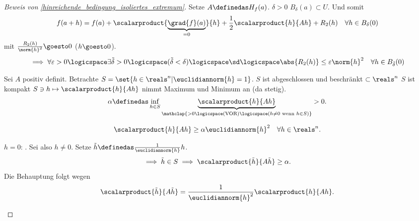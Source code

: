 \begin{proof}[Beweis von \ref{hinreichende_bedingung_isoliertes_extremum}]
  Setze \( A\definedas H_f(a) \). \texists \( \delta>0 \) \sd \( B_\delta(a)\subset U \). Und somit
  \begin{equation*}
    f(a+h)=f(a)+\scalarproduct{\underbrace{\grad{f}(a)}_{=0}}{h}+\frac{1}{2}\scalarproduct{h}{Ah}+R_2(h)\quad \forall h\in B_\delta(0)
  \end{equation*}
  mit \( \frac{R_2(h)}{\norm{h}^2}\goesto 0 \) (\( h\goesto 0 \)).
  \begin{equation*}
    \implies \forall \varepsilon>0 \logicspace \exists \tilde{\delta}>0\logicspace (\tilde{\delta}<\delta) \logicspace \text{\sd} \logicspace \abs{R_2(h)}\leq \varepsilon \norm{h}^2\quad \forall h\in B_{\tilde{\delta}}(0)
  \end{equation*}
  \begin{proofdescription}
    \item[\ref{hinreichende_bedingung_isoliertes_minimum}] Sei \( A \) positiv definit. Betrachte \( S=\set{h\in \reals^n|\euclidiannorm{h}=1} \). \( S \) ist abgeschlossen und beschränkt \( \subset \reals^n \) \timplies \( S \) ist kompakt \timplies \( S\ni h\mapsto \scalarproduct{h}{Ah} \) nimmt Maximum und Minimum an (da stetig).
    \begin{equation*}
      \alpha\definedas \inf_{h\in S}\underbrace{\scalarproduct{h}{Ah}}_{\mathclap{>0\logicspace  (\text{VOR})\logicspace (h\neq 0 \text{ wenn }h\in S)}}>0.
    \end{equation*}
    \begin{behauptung*}
      \begin{equation*}
        \scalarproduct{h}{Ah}\geq \alpha\euclidiannorm{h}^2 \quad \forall h\in \reals^n.
      \end{equation*}
    \end{behauptung*}
    \begin{subproof}
      \( h=0\): \checkmark. Sei also \( h\neq 0 \). Setze \( \tilde{h}\definedas\frac{1}{\euclidiannorm{h}}h \).  
      \begin{equation*}
        \implies \tilde{h}\in S\implies \scalarproduct{\tilde{h}}{A\tilde{h}}\geq \alpha.
      \end{equation*}
      Die Behauptung folgt wegen
      \begin{equation*}
        \scalarproduct{\tilde{h}}{A\tilde{h}}=\frac{1}{\euclidiannorm{h}^2}\scalarproduct{h}{Ah}.
      \end{equation*}
    \end{subproof}

\end{proofdescription}
\end{proof}

